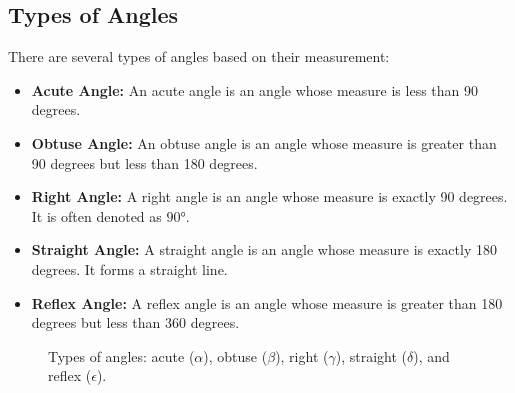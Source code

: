 \documentclass[a4paper,12pt]{book}
\begin{document}
\subsection{Types of Angles}

There are several types of angles based on their measurement:

\begin{itemize}
    \item \textbf{Acute Angle:} An acute angle is an angle whose measure is less than 90 degrees.
    
    \item \textbf{Obtuse Angle:} An obtuse angle is an angle whose measure is greater than 90 degrees but less than 180 degrees.
    
    \item \textbf{Right Angle:} A right angle is an angle whose measure is exactly 90 degrees. It is often denoted as $\ang{90}$.
    
    \item \textbf{Straight Angle:} A straight angle is an angle whose measure is exactly 180 degrees. It forms a straight line.
    
    \item \textbf{Reflex Angle:} A reflex angle is an angle whose measure is greater than 180 degrees but less than 360 degrees.
\end{itemize}


\begin{figure}[htbp]
    \centering
    \caption{Types of angles: acute ($\alpha$), obtuse ($\beta$), right ($\gamma$), straight ($\delta$), and reflex ($\epsilon$).}
    \label{fig:angle_types}
\end{figure}
\end{document}
